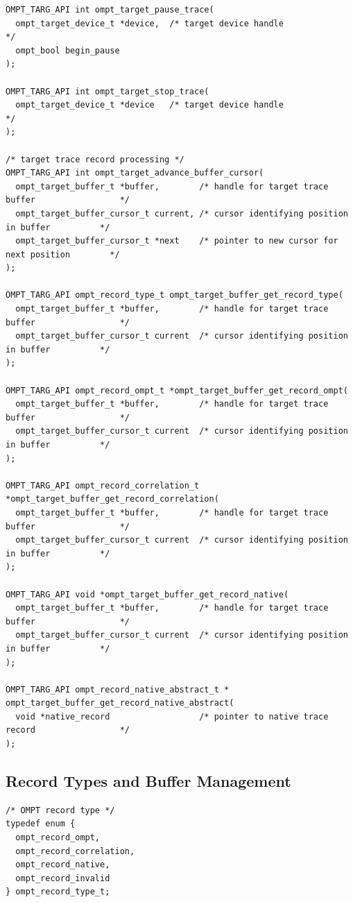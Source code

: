 \documentclass{article}
\begin{document}
{\begin{verbatim}
OMPT_TARG_API int ompt_target_pause_trace(
  ompt_target_device_t *device,  /* target device handle                                 */
  ompt_bool begin_pause
);

OMPT_TARG_API int ompt_target_stop_trace(
  ompt_target_device_t *device   /* target device handle                                 */
);

/* target trace record processing */
OMPT_TARG_API int ompt_target_advance_buffer_cursor(
  ompt_target_buffer_t *buffer,        /* handle for target trace buffer                 */
  ompt_target_buffer_cursor_t current, /* cursor identifying position in buffer          */
  ompt_target_buffer_cursor_t *next    /* pointer to new cursor for next position        */
);

OMPT_TARG_API ompt_record_type_t ompt_target_buffer_get_record_type(
  ompt_target_buffer_t *buffer,        /* handle for target trace buffer                 */
  ompt_target_buffer_cursor_t current  /* cursor identifying position in buffer          */
);

OMPT_TARG_API ompt_record_ompt_t *ompt_target_buffer_get_record_ompt(
  ompt_target_buffer_t *buffer,        /* handle for target trace buffer                 */
  ompt_target_buffer_cursor_t current  /* cursor identifying position in buffer          */
);

OMPT_TARG_API ompt_record_correlation_t *ompt_target_buffer_get_record_correlation(
  ompt_target_buffer_t *buffer,        /* handle for target trace buffer                 */
  ompt_target_buffer_cursor_t current  /* cursor identifying position in buffer          */
);
   
OMPT_TARG_API void *ompt_target_buffer_get_record_native(
  ompt_target_buffer_t *buffer,        /* handle for target trace buffer                 */
  ompt_target_buffer_cursor_t current  /* cursor identifying position in buffer          */
);
  
OMPT_TARG_API ompt_record_native_abstract_t *
ompt_target_buffer_get_record_native_abstract(
  void *native_record                  /* pointer to native trace record                 */
);
\end{verbatim}

\clearpage  
\subsection{Record Types and Buffer Management}
\label{appendix:ompt-records}

\begin{verbatim}
/* OMPT record type */
typedef enum {
  ompt_record_ompt,
  ompt_record_correlation,
  ompt_record_native,
  ompt_record_invalid
} ompt_record_type_t; 


\end{verbatim}}
\end{document}

